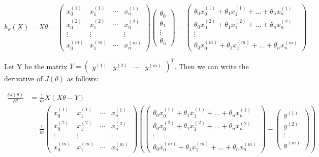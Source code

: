\documentclass{article}
\begin{document}
\begin{equation*}
h_\theta(X) = X \theta =  \begin{pmatrix} 
	x_0^{(1)} & x_1^{(1)} & \cdots & x_n^{(1)} \\
	x_0^{(2)} & x_1^{(2)} & \cdots & x_n^{(2)} \\
	\vdots & \vdots & & \vdots \\
	x_0^{(m)} & x_1^{(m)} & \cdots & x_n^{(m)}
     \end{pmatrix}
\begin{pmatrix}
\theta_0 \\
\theta_1 \\
\vdots \\
\theta_n
\end{pmatrix}
 = \begin{pmatrix}
\theta_0 x_0^{(1)} + \theta_1 x_1^{(1)}+  ... + \theta_n x_n^{(1)} \\
\theta_0 x_0^{(2)} + \theta_1 x_1^{(2)}+  ... + \theta_n x_n^{(2)}\\
\vdots \\
\theta_0 x_0^{(m)} + \theta_1 x_1^{(m)}+ ... + \theta_n x_n^{(m)}
\end{pmatrix}
\end{equation*}

Let Y be the matrix $Y = \begin{pmatrix} y^{(1)} & y^{(2)} & \cdots & y^{(m)} \end{pmatrix} ^T$. Then we can write the derivative of $J(\theta)$ as follows:

\begin{align*}
\frac{\delta J(\theta)}{\delta \theta} &= \frac{1}{m} X(X\theta - Y) \\
&= \frac{1}{m}\begin{pmatrix} 
	x_0^{(1)} & x_1^{(1)} & \cdots & x_n^{(1)} \\
	x_0^{(2)} & x_1^{(2)} & \cdots & x_n^{(2)} \\
	\vdots & \vdots & & \vdots \\
	x_0^{(m)} & x_1^{(m)} & \cdots & x_n^{(m)}
     \end{pmatrix}
\left( 
 \begin{pmatrix}
\theta_0 x_0^{(1)} + \theta_1 x_1^{(1)}+  ... + \theta_n x_n^{(1)} \\
\theta_0 x_0^{(2)} + \theta_1 x_1^{(2)}+  ... + \theta_n x_n^{(2)}\\
\vdots \\
\theta_0 x_0^{(m)} + \theta_1 x_1^{(m)}+ ... + \theta_n x_n^{(m)}
\end{pmatrix}
- \begin{pmatrix} y^{(1)} \\ y^{(2)} \\ \vdots \\ y^{(m)} \end{pmatrix}
\right)
\end{align*}
\end{document}

